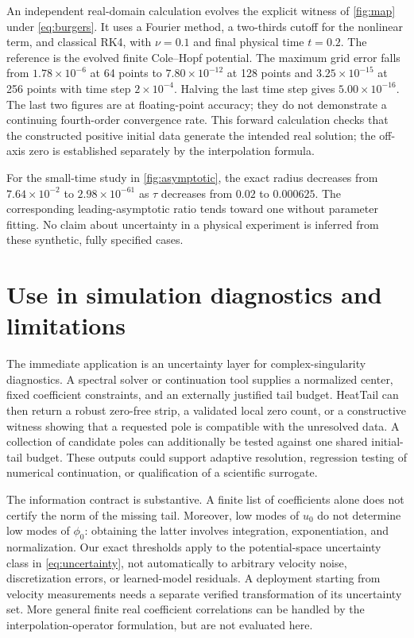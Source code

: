 \documentclass[11pt]{article}
\begin{document}
An independent real-domain calculation evolves the explicit witness of \cref{fig:map} under \eqref{eq:burgers}. It uses a Fourier method, a two-thirds cutoff for the nonlinear term, and classical RK4, with $\nu=0.1$ and final physical time $t=0.2$. The reference is the evolved finite Cole--Hopf potential. The maximum grid error falls from $1.78\times10^{-6}$ at 64 points to $7.80\times10^{-12}$ at 128 points and $3.25\times10^{-15}$ at 256 points with time step $2\times10^{-4}$. Halving the last time step gives $5.00\times10^{-16}$. The last two figures are at floating-point accuracy; they do not demonstrate a continuing fourth-order convergence rate. This forward calculation checks that the constructed positive initial data generate the intended real solution; the off-axis zero is established separately by the interpolation formula.

For the small-time study in \cref{fig:asymptotic}, the exact radius decreases from $7.64\times10^{-2}$ to $2.98\times10^{-61}$ as $\tau$ decreases from $0.02$ to $0.000625$. The corresponding leading-asymptotic ratio tends toward one without parameter fitting. No claim about uncertainty in a physical experiment is inferred from these synthetic, fully specified cases.

\section{Use in simulation diagnostics and limitations}
The immediate application is an uncertainty layer for complex-singularity diagnostics. A spectral solver or continuation tool supplies a normalized center, fixed coefficient constraints, and an externally justified tail budget. HeatTail can then return a robust zero-free strip, a validated local zero count, or a constructive witness showing that a requested pole is compatible with the unresolved data. A collection of candidate poles can additionally be tested against one shared initial-tail budget. These outputs could support adaptive resolution, regression testing of numerical continuation, or qualification of a scientific surrogate.

The information contract is substantive. A finite list of coefficients alone does not certify the norm of the missing tail. Moreover, low modes of $u_0$ do not determine low modes of $\phi_0$: obtaining the latter involves integration, exponentiation, and normalization. Our exact thresholds apply to the potential-space uncertainty class in \eqref{eq:uncertainty}, not automatically to arbitrary velocity noise, discretization errors, or learned-model residuals. A deployment starting from velocity measurements needs a separate verified transformation of its uncertainty set. More general finite real coefficient correlations can be handled by the interpolation-operator formulation, but are not evaluated here.
\end{document}
